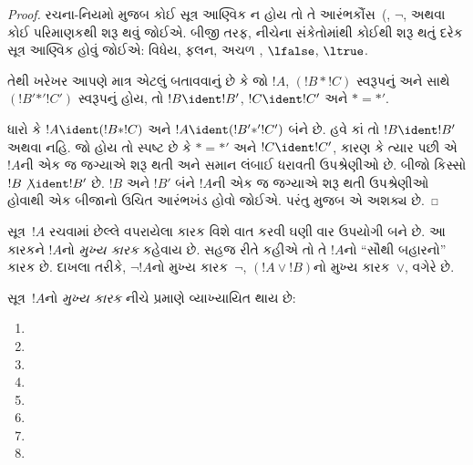 \begin{proof}
રચના-નિયમો મુજબ કોઈ સૂત્ર આણ્વિક ન હોય તો તે આરંભકૌંસ~(,
$\lnot$, અથવા કોઈ પરિમાણકથી શરૂ થવું જોઈએ. બીજી
તરફ, નીચેના સંકેતોમાંથી કોઈથી શરૂ થતું દરેક સૂત્ર આણ્વિક હોવું
જોઈએ: વિધેય, ફલન, અચળ
, $\lfalse$, $\ltrue$.

તેથી ખરેખર આપણે માત્ર એટલું બતાવવાનું છે કે જો $!A$, $(!B\ast !C)$
સ્વરૂપનું અને સાથે $(!B'\mathbin{\ast'}!C')$ સ્વરૂપનું હોય, તો
$!B\ident !B'$, $!C\ident !C'$ અને $\ast={\ast'}$.

ધારો કે $!A\ident(!B\ast !C)$ અને
$!A\ident(!B'\mathbin{\ast'}!C')$ બંને છે. હવે કાં તો
$!B\ident !B'$ અથવા નહિ. જો હોય તો સ્પષ્ટ છે કે $\ast={\ast'}$ અને
$!C\ident !C'$, કારણ કે ત્યાર પછી એ $!A$ની એક જ જગ્યાએ શરૂ થતી અને
સમાન લંબાઈ ધરાવતી ઉપશ્રેણીઓ છે. બીજો કિસ્સો $!B\not\ident !B'$ છે.
$!B$ અને $!B'$ બંને $!A$ની એક જ જગ્યાએ શરૂ થતી ઉપશ્રેણીઓ હોવાથી
એક બીજાનો ઉચિત આરંભખંડ હોવો જોઈએ. પરંતુ
 મુજબ એ અશક્ય છે.
\end{proof}
\endgroup


\begingroup
\makeatletter{}\makeatother


\label{guunit:OLP-0154}


\begin{explain}
સૂત્ર~$!A$ રચવામાં છેલ્લે વપરાયેલા કારક વિશે વાત કરવી ઘણી
વાર ઉપયોગી બને છે. આ કારકને $!A$નો \emph{મુખ્ય કારક} કહેવાય છે.
સહજ રીતે કહીએ તો તે $!A$નો ``સૌથી બહારનો'' કારક છે. દાખલા તરીકે,
$\lnot !A$નો મુખ્ય કારક~$\lnot$, $(!A\lor !B)$નો મુખ્ય કારક~$\lor$,
વગેરે છે.
\end{explain}


\begin{defn}[મુખ્ય કારક]
સૂત્ર~$!A$નો \emph{મુખ્ય કારક} નીચે પ્રમાણે
વ્યાખ્યાયિત થાય છે:
\begin{enumerate}
\item {}

\item {}

\item {}

\item {}

\item {}

\item {}

\item {}

\item {}
\end{enumerate}
\end{defn}

